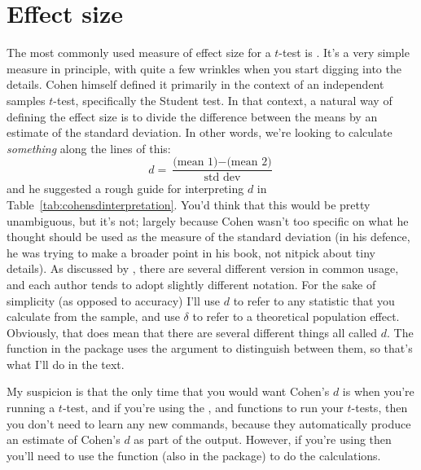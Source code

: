 \section{Effect size~\label{sec:cohensd}}


The most commonly used measure of effect size for a $t$-test is  \cite{Cohen1988}. It's a very simple measure in principle, with quite a few wrinkles when you start digging into the details. Cohen himself defined it primarily in the context of an independent samples $t$-test, specifically the Student test. In that context, a natural way of defining the effect size is to divide the difference between the means by an estimate of the standard deviation. In other words, we're looking to calculate {\it something} along the lines of this:
$$
d = \frac{\mbox{(mean 1)} - \mbox{(mean 2)}}{\mbox{std dev}}
$$
and he suggested a rough guide for interpreting $d$ in Table~\ref{tab:cohensdinterpretation}. You'd think that this would be pretty unambiguous, but it's not; largely because Cohen wasn't too specific on what he thought should be used as the measure of the standard deviation (in his defence, he was trying to make a broader point in his book, not nitpick about tiny details). As discussed by , there are several different version in common usage, and each author tends to adopt slightly different notation. For the sake of simplicity (as opposed to accuracy) I'll use $d$ to refer to any statistic that you calculate from the sample, and  use $\delta$ to refer to a theoretical population effect. Obviously, that does mean that there are several different things all called $d$. The  function in the  package uses the  argument to distinguish between them, so that's what I'll do in the text.

My suspicion is that the only time that you would want Cohen's $d$ is when you're running a $t$-test, and if you're using the ,  and  functions to run your $t$-tests, then you don't need to learn any new commands, because they automatically produce an estimate of Cohen's $d$ as part of the output. However, if you're using  then you'll need to use the  function (also in the  package) to do the calculations. 


